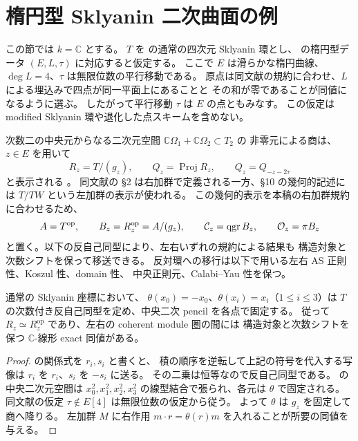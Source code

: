 \section{楕円型 Sklyanin 二次曲面の例}
\label{sec:sklyanin-examples}

この節では $k=\mathbb C$ とする。
$T$ を \cite[\S 7, (7.1), (7.2)]{BSW2010} の通常の四次元 Sklyanin 環とし、
\cite[\S 10.1]{SVdB2013} の楕円型データ $(E,L,\tau)$ に対応すると仮定する。
ここで $E$ は滑らかな楕円曲線、$\deg L=4$、$\tau$ は無限位数の平行移動である。
原点は同文献の規約に合わせ、$L$ による埋込みで四点が同一平面上にあることと
その和が零であることが同値になるように選ぶ。
したがって平行移動 $\tau$ は $E$ の点ともみなす。
この仮定は modified Sklyanin 環や退化した点スキームを含めない。

次数二の中央元からなる二次元空間 $\mathbb C\Omega_1+\mathbb C\Omega_2\subset T_2$ の
非零元による商は、$z\in E$ を用いて
\[
 R_z=T/(g_z),\qquad Q_z=\operatorname{Proj}R_z,
 \qquad Q_z=Q_{-z-2\tau}
\]
と表示される \cite[\S\S 10.2--10.4]{SVdB2013}。
同文献の \S 2 は右加群で定義される一方、\S 10 の幾何的記述には
$T/TW$ という左加群の表示が使われる。
この幾何的表示を本稿の右加群規約に合わせるため、
\[
 A=T^{\mathrm{op}},\qquad B_z=R_z^{\mathrm{op}}
       =A/(g_z),\qquad
 \mathcal C_z=\operatorname{qgr} B_z,\qquad \mathcal O_z=\pi B_z
\]
と置く。以下の反自己同型により、左右いずれの規約による結果も
構造対象と次数シフトを保って移送できる。
反対環への移行は以下で用いる左右 AS 正則性、Koszul 性、domain 性、
中央正則元、Calabi--Yau 性を保つ。

\begin{lemma}[左右規約の比較]
\label{lem:sklyanin-opposite}
通常の Sklyanin 座標において、
$\theta(x_0)=-x_0$、$\theta(x_i)=x_i$（$1\le i\le3$）は
$T$ の次数付き反自己同型を定め、中央二次 pencil を各点で固定する。
従って $R_z\simeq R_z^{\mathrm{op}}$ であり、左右の coherent module 圏の間には
構造対象と次数シフトを保つ $\mathbb C$-線形 exact 同値がある。
\end{lemma}
\begin{proof}
\cite[\S 7]{BSW2010} の関係式を $r_i,s_i$ と書くと、
積の順序を逆転して上記の符号を代入する写像は $r_i$ を $r_i$、$s_i$ を $-s_i$ に送る。
その二乗は恒等なので反自己同型である。
\cite[\S 1.1, pp.~38--39]{LS1993} の中央二次元空間は
$x_0^2,x_1^2,x_2^2,x_3^2$ の線型結合で張られ、各元は $\theta$ で固定される。
同文献の仮定 $\tau\notin E[4]$ は無限位数の仮定から従う。
よって $\theta$ は $g_z$ を固定して商へ降りる。
左加群 $M$ に右作用 $m\cdot r=\theta(r)m$ を入れることが所要の同値を与える。
\end{proof}


